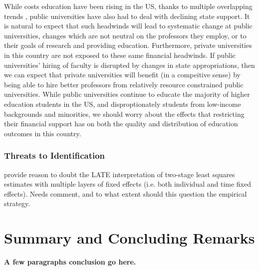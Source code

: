 \documentclass[notitlepage,12pt]{article}
\begin{document}
While costs education have been rising in the US, thanks to multiple overlapping trends \citep{ehrenberg2012}, public universities have also had to deal with declining state support.
It is natural to expect that such headwinds will lead to systematic change at public universities, changes which are not neutral on the professors they employ, or to their goals of research and providing education.
Furthermore, private universities in this country are not exposed to these same financial headwinds.
If public universities' hiring of faculty is disrupted by changes in state appropriations, then we can expect that private universities will benefit (in a compeitive sense) by being able to hire better professors from relatively resource constrained public universities.
While public universities continue to educate the majority of higher education students in the US, and disproptionately students from low-income backgrounds and minorities, we should worry about the effects that restricting their financial support has on both the quality and distribution of education outcomes in this country.


\subsubsection{Threats to Identification}

\cite{blandhol2022tsls} provide reason to doubt the LATE interpretation of two-stage least squares estimates with multiple layers of fixed effects (i.e. both individual and time fixed effects).
Needs comment, and to what extent should this question the empirical strategy.


\section{Summary and Concluding Remarks}
\label{sec:conclusion}

\textbf{A few paragraphs conclusion go here.} 






\appendix
\setcounter{table}{0}
\renewcommand{\thetable}{A\arabic{table}}
\setcounter{figure}{0}
\renewcommand{\thefigure}{A\arabic{figure}}

\end{document}
